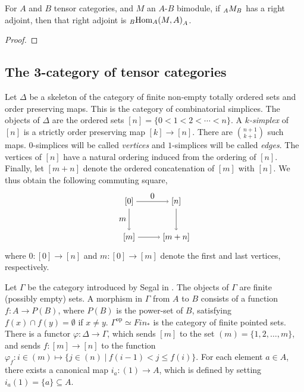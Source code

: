 \documentclass{amsart}
\begin{document}
\begin{corollary}
For $A$ and $B$ tensor categories, and $M$ an $A$-$B$ bimodule, if ${}_{A} {M}_{B}$ has a right adjoint, then that right adjoint is ${}_{B} {\operatorname{Hom}_A(M,A)}_{A}$.
\end{corollary}

\begin{proof}
\end{proof}



\subsection{The 3-category of tensor categories} \label{sec-tc-threecat}

Let $\Delta$ be a skeleton of the category of finite non-empty totally ordered sets and order preserving maps. This is the category of combinatorial simplices. The objects of $\Delta$ are the ordered sets $[n] = \{ 0 < 1 < 2 < \cdots < n\}$. A {\em $k$-simplex} of $[n]$ is a strictly order preserving map $[k] \to [n]$. There are $ {n+1}\choose {k+1}$ such maps. $0$-simplices will be called {\em vertices} and $1$-simplices will be called {\em edges}. The vertices of $[n]$ have a natural ordering induced from the ordering of $[n]$. Finally, let $[m + n]$ denote the ordered concatenation of $[m]$ with $[n]$. We thus obtain the following commuting square,
\begin{equation} \label{Eqn:Segal-Co-Map}
\begin{tikzpicture}[baseline = 0.75cm]
	\node (LT) at (0, 1.5) {$[0]$};
	\node (LB) at (0, 0) {$[m]$};
	\node (RT) at (2, 1.5) {$[n]$};
	\node (RB) at (2, 0) {$[m+n]$};
	\draw [->] (LT) -- node [left] {$m$} (LB);
	\draw [->] (LT) -- node [above] {$0$} (RT);
	\draw [->] (RT) -- node [right] {$$} (RB);
	\draw [->] (LB) -- node [below] {$$} (RB);
\end{tikzpicture}
\end{equation}
where $0: [0] \to [n]$ and $m: [0] \to [m]$ denote the first and last vertices, respectively. 

Let $\Gamma$ be the category introduced by Segal in \cite{Segal-Categories and Cohomology Theories}. The objects of $\Gamma$ are finite (possibly empty) sets. A morphism in $\Gamma$ from $A$ to $B$ consists of a function $f: A \to P(B)$, where $P(B)$ is the power-set of $B$, satisfying $f(x) \cap f(y) = \emptyset$ if $x \neq y$. $\Gamma^\textrm{op} \simeq Fin_*$ is the category of finite pointed sets. There is a functor $\varphi:\Delta \to \Gamma$, which sends $[m]$ to the set $(m) = \{ 1, 2, \dots, m\}$, and sends $f: [m] \to [n]$ to the function $\varphi_f: i \in (m) \mapsto \{ j \in (n) \; | \: f(i-1) < j \leq f(i) \}$. For each element $a \in A$, there exists a canonical map $i_a: (1) \to A$, which is defined by setting $i_a(1) = \{a\} \subseteq A$. 
\end{document}
